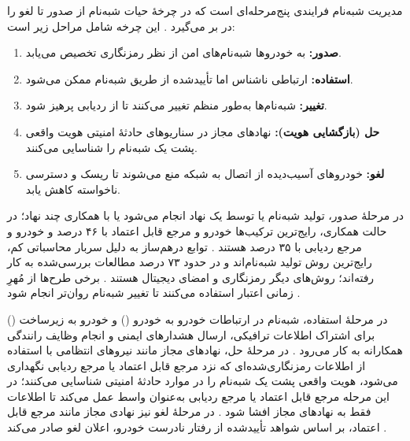 مدیریت شبه‌نام فرایندی پنج‌مرحله‌ای است که در چرخهٔ حیات شبه‌نام از صدور تا لغو را در بر می‌گیرد \cite{rahmawatiagustinaSystematicLiteratureReview2025}. این چرخه شامل مراحل زیر است:

\begin{enumerate}
  \item \textbf{صدور:} به خودروها شبه‌نام‌های امن از نظر رمزنگاری تخصیص می‌یابد.
  \item \textbf{استفاده:} ارتباطی ناشناس اما تأییدشده از طریق شبه‌نام ممکن می‌شود.
  \item \textbf{تغییر:} شبه‌نام‌ها به‌طور منظم تغییر می‌کنند تا از ردیابی پرهیز شود.
  \item \textbf{حل (بازگشایی هویت):} نهادهای مجاز در سناریوهای حادثهٔ امنیتی هویت واقعی پشت یک شبه‌نام را شناسایی می‌کنند.
  \item \textbf{لغو:} خودروهای آسیب‌دیده از اتصال به شبکه منع می‌شوند تا ریسک و دسترسی ناخواسته کاهش یابد.
\end{enumerate}

در مرحلهٔ صدور، تولید شبه‌نام یا توسط یک نهاد انجام می‌شود یا با همکاری چند نهاد؛ در حالت همکاری، رایج‌ترین ترکیب‌ها خودرو و مرجع قابل اعتماد با ۴۶ درصد و خودرو و مرجع ردیابی با ۳۵ درصد هستند \cite{rahmawatiagustinaSystematicLiteratureReview2025}. توابع درهم‌ساز به دلیل سربار محاسباتی کم، رایج‌ترین روش تولید شبه‌نام‌اند و در حدود ۷۳ درصد مطالعات بررسی‌شده به کار رفته‌اند؛ روش‌های دیگر رمزنگاری و امضای دیجیتال هستند \cite{rahmawatiagustinaSystematicLiteratureReview2025}. برخی طرح‌ها از مُهرِ زمانی اعتبار استفاده می‌کنند تا تغییر شبه‌نام روان‌تر انجام شود \cite{rahmawatiagustinaSystematicLiteratureReview2025}.

در مرحلهٔ استفاده، شبه‌نام در ارتباطات خودرو به خودرو () و خودرو به زیرساخت () برای اشتراک اطلاعات ترافیکی، ارسال هشدارهای ایمنی و انجام وظایف رانندگی همکارانه به کار می‌رود \cite{rahmawatiagustinaSystematicLiteratureReview2025}. در مرحلهٔ حل، نهادهای مجاز مانند نیروهای انتظامی با استفاده از اطلاعات رمزنگاری‌شده‌ای که نزد مرجع قابل اعتماد یا مرجع ردیابی نگهداری می‌شود، هویت واقعی پشت یک شبه‌نام را در موارد حادثهٔ امنیتی شناسایی می‌کنند؛ در این مرحله مرجع قابل اعتماد یا مرجع ردیابی به‌عنوان واسط عمل می‌کند تا اطلاعات فقط به نهادهای مجاز افشا شود \cite{rahmawatiagustinaSystematicLiteratureReview2025}. در مرحلهٔ لغو نیز نهادی مجاز مانند مرجع قابل اعتماد، بر اساس شواهد تأییدشده از رفتار نادرست خودرو، اعلان لغو صادر می‌کند \cite{rahmawatiagustinaSystematicLiteratureReview2025}.


